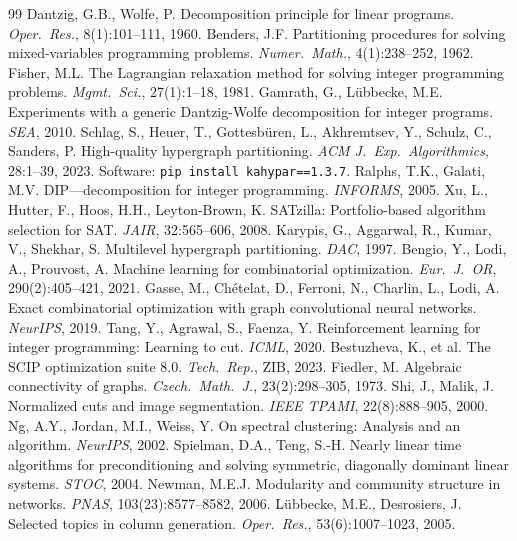\documentclass[11pt]{article}
\begin{document}

\begin{thebibliography}{99}
 Dantzig, G.B., Wolfe, P. Decomposition principle for linear programs. \emph{Oper.\ Res.}, 8(1):101--111, 1960.
 Benders, J.F. Partitioning procedures for solving mixed-variables programming problems. \emph{Numer.\ Math.}, 4(1):238--252, 1962.
 Fisher, M.L. The Lagrangian relaxation method for solving integer programming problems. \emph{Mgmt.\ Sci.}, 27(1):1--18, 1981.
 Gamrath, G., L\"ubbecke, M.E. Experiments with a generic Dantzig-Wolfe decomposition for integer programs. \emph{SEA}, 2010.
 Schlag, S., Heuer, T., Gottesbüren, L., Akhremtsev, Y., Schulz, C., Sanders, P. High-quality hypergraph partitioning. \emph{ACM J.\ Exp.\ Algorithmics}, 28:1--39, 2023. Software: \texttt{pip install kahypar==1.3.7}.
 Ralphs, T.K., Galati, M.V. DIP---decomposition for integer programming. \emph{INFORMS}, 2005.
 Xu, L., Hutter, F., Hoos, H.H., Leyton-Brown, K. SATzilla: Portfolio-based algorithm selection for SAT. \emph{JAIR}, 32:565--606, 2008.
 Karypis, G., Aggarwal, R., Kumar, V., Shekhar, S. Multilevel hypergraph partitioning. \emph{DAC}, 1997.
 Bengio, Y., Lodi, A., Prouvost, A. Machine learning for combinatorial optimization. \emph{Eur.\ J.\ OR}, 290(2):405--421, 2021.
 Gasse, M., Ch\'{e}telat, D., Ferroni, N., Charlin, L., Lodi, A. Exact combinatorial optimization with graph convolutional neural networks. \emph{NeurIPS}, 2019.
 Tang, Y., Agrawal, S., Faenza, Y. Reinforcement learning for integer programming: Learning to cut. \emph{ICML}, 2020.
 Bestuzheva, K., et al. The SCIP optimization suite 8.0. \emph{Tech.\ Rep.}, ZIB, 2023.
 Fiedler, M. Algebraic connectivity of graphs. \emph{Czech.\ Math.\ J.}, 23(2):298--305, 1973.
 Shi, J., Malik, J. Normalized cuts and image segmentation. \emph{IEEE TPAMI}, 22(8):888--905, 2000.
 Ng, A.Y., Jordan, M.I., Weiss, Y. On spectral clustering: Analysis and an algorithm. \emph{NeurIPS}, 2002.
 Spielman, D.A., Teng, S.-H. Nearly linear time algorithms for preconditioning and solving symmetric, diagonally dominant linear systems. \emph{STOC}, 2004.
 Newman, M.E.J. Modularity and community structure in networks. \emph{PNAS}, 103(23):8577--8582, 2006.
 L\"ubbecke, M.E., Desrosiers, J. Selected topics in column generation. \emph{Oper.\ Res.}, 53(6):1007--1023, 2005.

\end{thebibliography}
\end{document}
